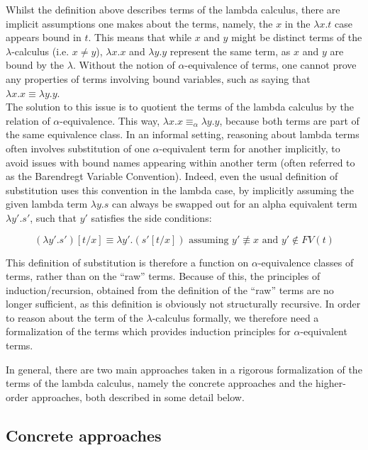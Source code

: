 Whilst the definition above describes terms of the lambda calculus,
there are implicit assumptions one makes about the terms, namely, the
\(x\) in the \(\lambda x.t\) case appears bound in \(t\). This means
that while \(x\) and \(y\) might be distinct terms of the
\(\lambda\)-calculus (i.e. \(x \neq y\)), \(\lambda x.x\) and
\(\lambda y.y\) represent the same term, as \(x\) and \(y\) are bound by
the \(\lambda\). Without the notion of \(\alpha\)-equivalence of terms,
one cannot prove any properties of terms involving bound variables, such
as saying that \(\lambda x.x \equiv \lambda y.y\).\\
The solution to this issue is to quotient the terms of the lambda
calculus by the relation of \(\alpha\)-equivalence. This way,
\(\lambda x.x \equiv_\alpha \lambda y.y\), because both terms are part
of the same equivalence class. In an informal setting, reasoning about
lambda terms often involves substitution of one \(\alpha\)-equivalent
term for another implicitly, to avoid issues with bound names appearing
within another term (often referred to as the Barendregt Variable
Convention). Indeed, even the usual definition of substitution uses this
convention in the lambda case, by implicitly assuming the given lambda
term \(\lambda y. s\) can always be swapped out for an alpha equivalent
term \(\lambda y'. s'\), such that \(y'\) satisfies the side conditions:

\[(\lambda y'. s')[t/x] \equiv \lambda y'.(s'[t/x]) \text{ assuming } y' \not\equiv x\text{ and }y' \not\in FV(t)\]

This definition of substitution is therefore a function on
\(\alpha\)-equivalence classes of terms, rather than on the ``raw''
terms. Because of this, the principles of induction/recursion, obtained
from the definition of the ``raw'' terms are no longer sufficient, as
this definition is obviously not structurally recursive. In order to
reason about the term of the \(\lambda\)-calculus formally, we therefore
need a formalization of the terms which provides induction principles
for \(\alpha\)-equivalent terms.

In general, there are two main approaches taken in a rigorous
formalization of the terms of the lambda calculus, namely the concrete
approaches and the higher-order approaches, both described in some
detail below.

\subsection{Concrete approaches}\label{concrete-approaches}

